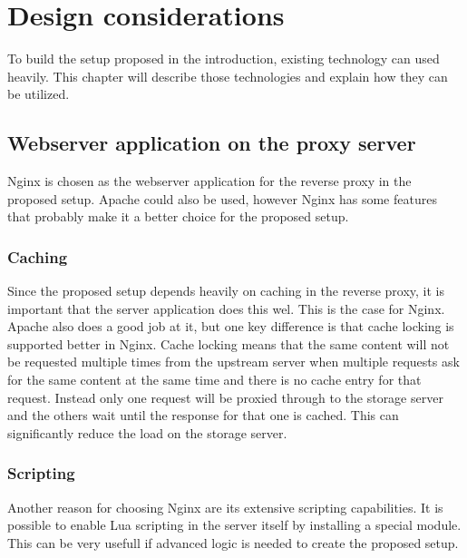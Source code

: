 \documentclass[twoside,openright]{uva-bachelor-thesis}
\begin{document}
\chapter{Design considerations}
To build the setup proposed in the introduction, existing technology can used
heavily. This chapter will describe those technologies and explain how they can
be utilized.


\section{Webserver application on the proxy server}
Nginx is chosen as the webserver application for the reverse proxy in the
proposed setup. Apache could also be used, however Nginx has some features that
probably make it a better choice for the proposed setup.

\subsection{Caching}\label{sec:caching}
Since the proposed setup depends heavily on caching in the reverse proxy, it is
important that the server application does this wel. This is the case for Nginx.
Apache also does a good job at it, but one key difference is that cache locking is
supported better in Nginx. Cache locking means that the same content will not be
requested multiple times from the upstream server when multiple requests ask for
the same content at the same time and there is no cache entry for that
request. Instead only one request will be proxied through to the storage server
and the others wait until the response for that one is cached. This can
significantly reduce the load on the storage server.

\subsection{Scripting}
Another reason for choosing Nginx are its extensive scripting capabilities. It
is possible to enable Lua scripting in the server itself by installing a special
module\autocite{nginxlua}. This can be very usefull if advanced logic is needed
to create the proposed setup.
\end{document}
